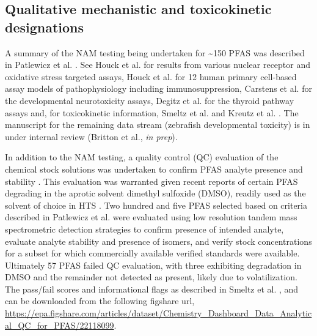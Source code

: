 \documentclass[
  super,
  preprint,
  3p]{elsarticle}
\begin{document}
\hypertarget{sec-nam-flag}{%
\subsection{Qualitative mechanistic and toxicokinetic
designations}\label{sec-nam-flag}}

A summary of the NAM testing being undertaken for \textasciitilde150
PFAS was described in Patlewicz et al. \citep{patlewicz_towards_2022}.
See Houck et al. \citep{houck_bioactivity_2021} for results from various
nuclear receptor and oxidative stress targeted assays, Houck et al.
\citep{houck_evaluation_2023} for 12 human primary cell-based assay
models of pathophysiology including immunosuppression, Carstens et al.
\citep{carstens_evaluation_2023} for the developmental neurotoxicity
assays, Degitz et al. \citep{degitz_2024} for the thyroid pathway assays
and, for toxicokinetic information, Smeltz et al.
\citep{smeltz_plasma_2023} and Kreutz et al.
\citep{kreutz_category-based_2023}. The manuscript for the remaining
data stream (zebrafish developmental toxicity) is in under internal
review (Britton et al., \emph{in prep}).

In addition to the NAM testing, a quality control (QC) evaluation of the
chemical stock solutions was undertaken to confirm PFAS analyte presence
and stability \citep{smeltz_targeted_2023}. This evaluation was
warranted given recent reports of certain PFAS degrading in the aprotic
solvent dimethyl sulfoxide (DMSO), readily used as the solvent of choice
in HTS \citep{liberatore_solvent_2020, zhang_stability_2022}. Two
hundred and five PFAS selected based on criteria described in Patlewicz
et al. \citep{patlewicz_towards_2022} were evaluated using low
resolution tandem mass spectrometric detection strategies to confirm
presence of intended analyte, evaluate analyte stability and presence of
isomers, and verify stock concentrations for a subset for which
commercially available verified standards were available. Ultimately 57
PFAS failed QC evaluation, with three exhibiting degradation in DMSO and
the remainder not detected as present, likely due to volatilization. The
pass/fail scores and informational flags as described in Smeltz et al.
\citep{smeltz_targeted_2023}, and can be downloaded from the following
figshare url,
\url{https://epa.figshare.com/articles/dataset/Chemistry_Dashboard_Data_Analytical_QC_for_PFAS/22118099}.
\end{document}
